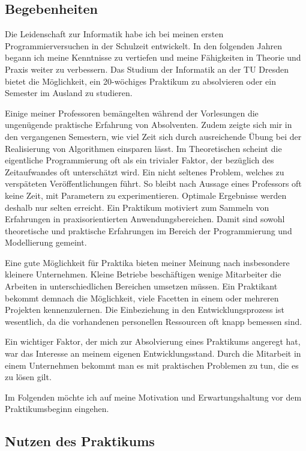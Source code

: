 \documentclass[12pt]{article}
\begin{document}
\subsection{Begebenheiten}

Die Leidenschaft zur Informatik habe ich bei meinen ersten Programmierversuchen in der Schulzeit entwickelt.
In den folgenden Jahren begann ich meine Kenntnisse zu vertiefen und meine Fähigkeiten in Theorie
und Praxis weiter zu verbessern. Das Studium der Informatik an der TU Dresden bietet die Möglichkeit,
ein 20-wöchiges Praktikum zu absolvieren oder ein Semester im Ausland zu studieren.

Einige meiner Professoren bemängelten während der Vorlesungen die ungenügende praktische Erfahrung von
Absolventen. Zudem zeigte sich mir in den vergangenen Semestern, wie viel Zeit sich durch ausreichende Übung
bei der Realisierung von Algorithmen einsparen lässt. Im Theoretischen scheint die eigentliche Programmierung
oft als ein trivialer Faktor, der bezüglich des Zeitaufwandes oft unterschätzt wird. 
Ein nicht seltenes Problem, welches zu verspäteten Veröffentlichungen führt.
So bleibt nach Aussage eines Professors oft keine Zeit, mit Parametern zu experimentieren.
Optimale Ergebnisse werden deshalb nur selten erreicht.
Ein Praktikum motiviert zum Sammeln von Erfahrungen in praxisorientierten Anwendungsbereichen. Damit sind sowohl
theoretische und praktische Erfahrungen im Bereich der Programmierung und Modellierung gemeint.

Eine gute Möglichkeit für Praktika bieten meiner Meinung nach insbesondere kleinere Unternehmen. 
Kleine Betriebe beschäftigen wenige Mitarbeiter die Arbeiten in unterschiedlichen Bereichen umsetzen müssen.
Ein Praktikant bekommt demnach die Möglichkeit, viele Facetten in einem oder mehreren Projekten kennenzulernen.
Die Einbeziehung in den Entwicklungsprozess ist wesentlich, da die vorhandenen personellen Ressourcen oft knapp
bemessen sind.
 
Ein wichtiger Faktor, der mich zur Absolvierung eines Praktikums angeregt hat, war das Interesse an meinem
eigenen Entwicklungsstand. Durch die Mitarbeit in einem Unternehmen bekommt man es mit praktischen Problemen
zu tun, die es zu lösen gilt.

Im Folgenden möchte ich auf meine Motivation und Erwartungshaltung vor dem Praktikumsbeginn eingehen.

\subsection{Nutzen des Praktikums}
\end{document}
